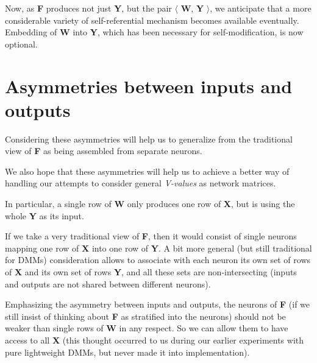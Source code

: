 \documentclass{article}
\begin{document}
\smallskip

Now, as {\bf F} produces not just {\bf Y}, but the pair $\langle\!\!$ {\bf W}, {\bf Y} $\!\!\rangle$, we anticipate that
a more considerable variety of self-referential mechanism becomes available eventually. Embedding of {\bf W} into {\bf Y}, which has been necessary for self-modification, is now optional.

\section{Asymmetries between inputs and outputs}

Considering these asymmetries will help us to generalize from the traditional view of {\bf F} as being assembled from separate neurons.

\smallskip

We also hope that these asymmetries will help us to achieve a better way of handling our attempts to 
consider general {\em V-values} as network matrices.

\bigskip

In particular, a single row of {\bf W} only produces one row of {\bf X}, but is using the whole {\bf Y} as its input.

\smallskip

If we take a very traditional view of {\bf F}, then it would consist of single neurons mapping one row of {\bf X} into one row of {\bf Y}. A bit more general (but still traditional for DMMs) consideration allows to associate with each neuron its own set of rows of {\bf X} and its own set of rows {\bf Y}, and all these sets are non-intersecting (inputs and outputs are not shared between different neurons). 

\bigskip

Emphasizing the asymmetry between inputs and outputs, the neurons of {\bf F} (if we still insist of thinking about {\bf F}
as stratified into the neurons) should not be weaker than single rows of {\bf W} in any respect. So we can allow them to have
access to all {\bf X} (this thought occurred to us during our earlier experiments with pure lightweight DMMs, 
but never made it into implementation).
\end{document}
